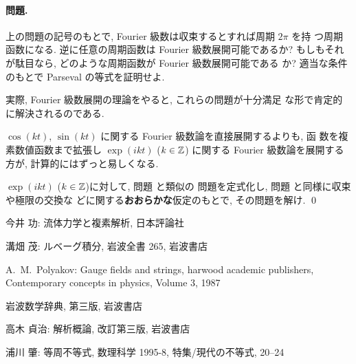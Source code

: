 \documentclass[12pt,twoside]{jarticle}
\def\Z{{\Bbb Z}} %
\begin{document}
\paragraph{問題.} 
上の問題の記号のもとで, Fourier 級数は収束するとすれば周期 $2\pi$ を持
つ周期函数になる. 逆に任意の周期函数は Fourier 級数展開可能であるか? 
もしもそれが駄目なら, どのような周期函数が Fourier 級数展開可能である
か? 適当な条件のもとで Parseval の等式を証明せよ.

\medskip

\noindent 実際, Fourier 級数展開の理論をやると, これらの問題が十分満足
な形で肯定的に解決されるのである.

\medskip

$\cos(kt)$, $\sin(kt)$ に関する Fourier 級数論を直接展開するよりも, 函
数を複素数値函数まで拡張し $\exp(ikt)$ ($k \in \Z$) に関する Fourier 
級数論を展開する方が, 計算的にはずっと易しくなる.

\begin{question}\label{q:Fourier2}
  $\exp(ikt)$ ($k \in \Z$)に対して, 問題  と類似の
  問題を定式化し, 問題  と同様に収束や極限の交換な
  どに関する{\bf おおらかな}仮定のもとで, その問題を解け. \qed
\end{question}


\begin{thebibliography}{ABC}


今井 功: 流体力学と複素解析, 日本評論社


溝畑 茂: ルベーグ積分, 岩波全書 265, 岩波書店

A.~M.~Polyakov: Gauge fields and strings, harwood academic publishers,
Contemporary concepts in physics, Volume 3, 1987


岩波数学辞典, 第三版, 岩波書店

高木 貞治: 解析概論, 改訂第三版, 岩波書店


浦川 肇: 等周不等式, 数理科学 1995-8, 特集/現代の不等式, 20--24




\end{thebibliography}

\end{document}
